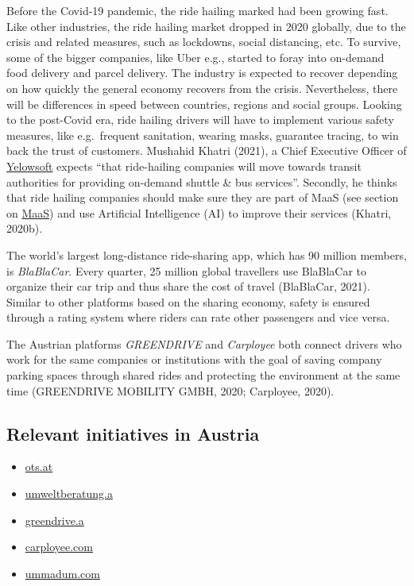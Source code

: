 \documentclass[
]{book}
\providecommand{\tightlist}{%
  \setlength{\itemsep}{0pt}\setlength{\parskip}{0pt}}
\begin{document}
Before the Covid-19 pandemic, the ride hailing marked had been growing fast. Like other industries, the ride hailing market dropped in 2020 globally, due to the crisis and related measures, such as lockdowns, social distancing, etc. To survive, some of the bigger companies, like Uber e.g., started to foray into on-demand food delivery and parcel delivery. The industry is expected to recover depending on how quickly the general economy recovers from the crisis. Nevertheless, there will be differences in speed between countries, regions and social groups. Looking to the post-Covid era, ride hailing drivers will have to implement various safety measures, like e.g.~frequent sanitation, wearing masks, guarantee tracing, to win back the trust of customers. Mushahid Khatri (2021), a Chief Executive Officer of \href{https://www.yelowsoft.com/}{Yelowsoft} expects ``that ride-hailing companies will move towards transit authorities for providing on-demand shuttle \& bus services''. Secondly, he thinks that ride hailing companies should make sure they are part of MaaS (see section on \protect\hyperlink{maas}{MaaS}) and use Artificial Intelligence (AI) to improve their services (Khatri, 2020b).

The world's largest long-distance ride-sharing app, which has 90 million members, is \emph{BlaBlaCar}. Every quarter, 25 million global travellers use BlaBlaCar to organize their car trip and thus share the cost of travel (BlaBlaCar, 2021). Similar to other platforms based on the sharing economy, safety is ensured through a rating system where riders can rate other passengers and vice versa.

The Austrian platforms \emph{GREENDRIVE} and \emph{Carployee} both connect drivers who work for the same companies or institutions with the goal of saving company parking spaces through shared rides and protecting the environment at the same time (GREENDRIVE MOBILITY GMBH, 2020; Carployee, 2020).

\hypertarget{relevant-initiatives-in-austria-45}{%
\subsection*{Relevant initiatives in Austria}\label{relevant-initiatives-in-austria-45}}

\begin{itemize}
\tightlist
\item
  \href{https://www.ots.at/presseaussendung/OTS_20210113_OTS0026/free-now-will-als-erste-mobilitaetsplattform-in-europa-bis-2030-null-emissionen-erreichen}{ots.at}
\item
  \href{https://www.umweltberatung.at/carsharing-mitfahrboersen}{umweltberatung.a}
\item
  \href{https://greendrive.at/premium/\#benefits}{greendrive.a}
\item
  \href{https://www.carployee.com/\#start-section}{carployee.com}
\item
  \href{https://ummadum.com/}{ummadum.com}
\end{itemize}
\end{document}
